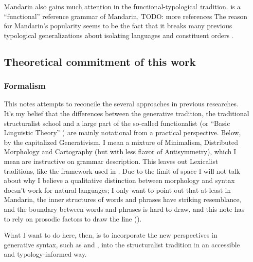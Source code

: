 \documentclass[UTF8, a4paper, oneside, scheme=plain, 12pt]{ctexrep}
\newcommand*{\citechap}[1]{chap.~{#1}}
\begin{document}
Mandarin also gains much attention in the functional-typological tradition.
\citet{li1989mandarin} is a ``functional'' reference grammar of Mandarin, TODO: more references
The reason for Mandarin's popularity seems to be the fact that 
it breaks many previous typological generalizations about isolating languages and constituent orders
\citep[\citechap{8}]{paul2014new}.

\subsection{Theoretical commitment of this work}\label{sec:theory}

{\small

\subsubsection{Formalism}

This notes attempts to reconcile the several approaches in previous researches.
It's my belief that the differences between the generative tradition, 
the traditional structuralist school 
and a large part of the so-called functionalist 
(or ``Basic Linguistic Theory'' \citep{dixon2009basic}) 
are mainly notational from a practical perspective.
Below, by the capitalized Generativism,
I mean a mixture of Minimalism, Distributed Morphology and Cartography
(but with less flavor of Antisymmetry),
which I mean are instructive on grammar description.
This leaves out Lexicalist traditions, 
like the framework used in \citet{deng2010formal}.
Due to the limit of space I will not talk about 
why I believe a qualitative distinction between morphology and syntax 
doesn't work for natural languages; 
I only want to point out that at least in Mandarin, 
the inner structures of words and phrases 
have striking resemblance, 
and the boundary between words and phrases 
is hard to draw, 
and this note has to rely on prosodic factors to draw the line
().

What I want to do here, then, 
is to incorporate the new perspectives in generative syntax, 
such as \citet{paul2014new} and \citet{paul2008serial},
into the structuralist tradition
in an accessible and typology-informed way.

}
\end{document}
